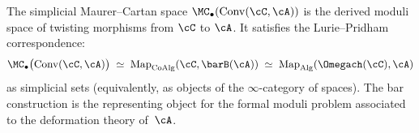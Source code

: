 \begin{theorem}
\label{thm:formal-moduli-twisting}
The simplicial Maurer--Cartan space
$\MC_\bullet(\mathrm{Conv}(\cC, \cA))$ is the derived moduli space
of twisting morphisms from $\cC$ to $\cA$. It satisfies the
Lurie--Pridham correspondence:
\begin{equation}\label{eq:formal-moduli-twisting}
\MC_\bullet\bigl(\mathrm{Conv}(\cC, \cA)\bigr)
\;\simeq\;
\mathrm{Map}_{\mathrm{CoAlg}}(\cC, \barB(\cA))
\;\simeq\;
\mathrm{Map}_{\mathrm{Alg}}(\Omegach(\cC), \cA)
\end{equation}
as simplicial sets \textup{(}equivalently, as objects of the
$\infty$-category of spaces\textup{)}. The bar construction is
the representing object for the formal moduli problem associated
to the deformation theory of~$\cA$.
\end{theorem}

